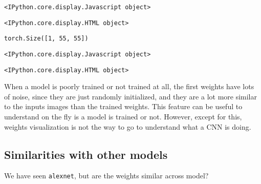 \documentclass[11pt]{article}
\begin{document}
    
    \begin{verbatim}
<IPython.core.display.Javascript object>
    \end{verbatim}

    
    
    \begin{verbatim}
<IPython.core.display.HTML object>
    \end{verbatim}

    
    \begin{Verbatim}[commandchars=\\\{\}]
torch.Size([1, 55, 55])

    \end{Verbatim}

    
    \begin{verbatim}
<IPython.core.display.Javascript object>
    \end{verbatim}

    
    
    \begin{verbatim}
<IPython.core.display.HTML object>
    \end{verbatim}

    
    When a model is poorly trained or not trained at all, the first weights
have lots of noise, since they are just randomly initialized, and they
are a lot more similar to the inputs images than the trained weights.
This feature can be useful to understand on the fly is a model is
trained or not. However, except for this, weights visualization is not
the way to go to understand what a CNN is doing.

    \subsection{Similarities with other
models}\label{similarities-with-other-models}

We have seen \texttt{alexnet}, but are the weights similar across model?
\end{document}
